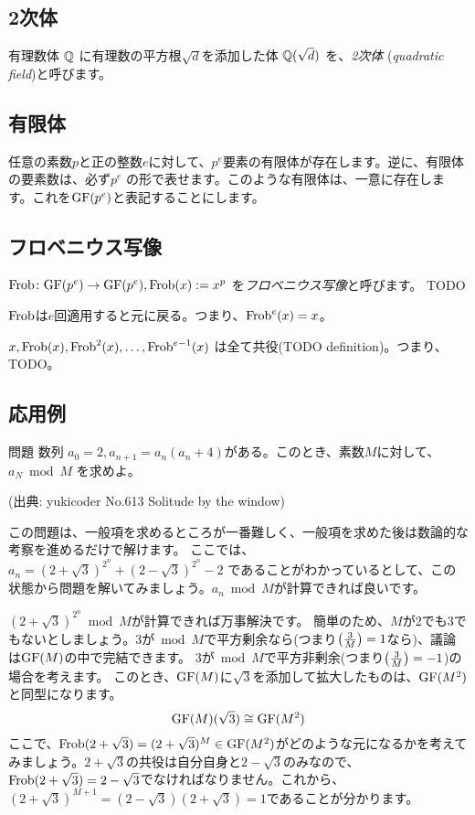 \documentclass{jsarticle}
\begin{document}
  \subsection{2次体}
  \label{subsec:quadratic-field}
  有理数体 $\mathbb{Q}$ に有理数の平方根$\sqrt{d}$を添加した体 $\mathbb{Q}(\sqrt{d})$ を、\emph{2次体} (\emph{quadratic field})と呼びます。
  \subsection{有限体}
  任意の素数$p$と正の整数$e$に対して、$p^e$要素の有限体が存在します。逆に、有限体の要素数は、必ず$p^e$ の形で表せます。このような有限体は、一意に存在します。これを$\mathrm{GF}(p^e)$と表記することにします。
  \subsection{フロベニウス写像}
  $\mathrm{Frob} \colon \mathrm{GF}(p^e) \to \mathrm{GF}(p^e), \mathrm{Frob}(x) := x^p$ を\emph{フロベニウス写像}と呼びます。 TODO
  \begin{proposition}
   $\mathrm{Frob}$は$e$回適用すると元に戻る。つまり、$\mathrm{Frob}^e(x) = x$。
  \end{proposition}
  \begin{proposition}
   $x, \mathrm{Frob}(x), \mathrm{Frob}^2(x), \ldots, \mathrm{Frob}^{e-1}(x)$ は全て共役(TODO definition)。つまり、TODO。
  \end{proposition}
  \subsection{応用例}
  \label{subsec:application-of-frobenius}
  \begin{itembox}[l]{問題}
   数列 $a_0 = 2, a_{n+1} = a_n(a_n+4)$がある。このとき、素数$M$に対して、$a_N \bmod M$ を求めよ。

   (出典: yukicoder No.613 Solitude by the window)
  \end{itembox}
  この問題は、一般項を求めるところが一番難しく、一般項を求めた後は数論的な考察を進めるだけで解けます。
  ここでは、$a_n = (2+\sqrt{3})^{2^n} + (2-\sqrt{3})^{2^n} - 2$ であることがわかっているとして、この状態から問題を解いてみましょう。$a_n \bmod M$が計算できれば良いです。

  $(2+\sqrt{3})^{2^n} \bmod M$が計算できれば万事解決です。
  簡単のため、$M$が2でも3でもないとしましょう。3が${}\bmod M$で平方剰余なら(つまり$\left(\frac{3}{M}\right)=1$なら)、議論は$\mathrm{GF}(M)$の中で完結できます。
  3が${}\bmod M$で平方非剰余(つまり$\left(\frac{3}{M}\right)=-1$)の場合を考えます。
  このとき、$\mathrm{GF}(M)$に$\sqrt{3}$を添加して拡大したものは、$\mathrm{GF}(M^2)$と同型になります。
  \begin{displaymath}
   \mathrm{GF}(M)(\sqrt{3}) \cong \mathrm{GF}(M^2)
  \end{displaymath}
  ここで、$\mathrm{Frob}(2+\sqrt{3}) = (2+\sqrt{3})^M \in \mathrm{GF}(M^2)$がどのような元になるかを考えてみましょう。$2+\sqrt{3}$の共役は自分自身と$2-\sqrt{3}$のみなので、$\mathrm{Frob}(2+\sqrt{3})=2-\sqrt{3}$でなければなりません。これから、$(2+\sqrt{3})^{M+1}=(2-\sqrt{3})(2+\sqrt{3})=1$であることが分かります。
\end{document}

